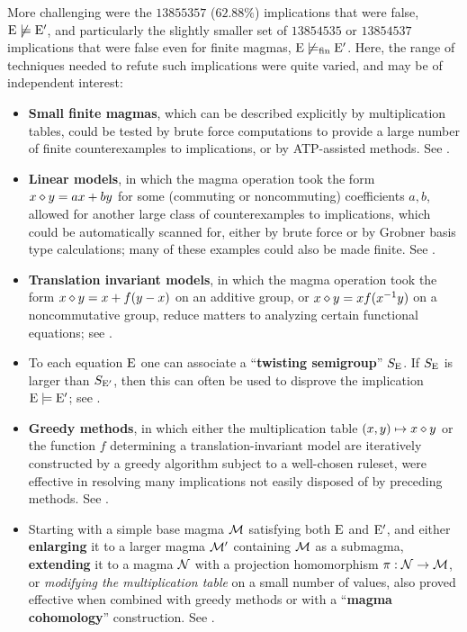 More challenging were the $\num{13855357}$ ($62.88\%$) implications that were false, $\mathrm{E} \not\models {\mathrm{E}'}$, and particularly the slightly smaller set of $\num{13854535}$ or $\num{13854537}$ implications that were false even for finite magmas, $\mathrm{E} \not\models_{\mathrm{fin}} {\mathrm{E}'}$. Here, the range of techniques needed to refute such implications were quite varied, and may be of independent interest:
\begin{itemize}
        \item \textbf{Small finite magmas}, which can be described explicitly by multiplication tables, could be tested by brute force computations to provide a large number of finite counterexamples to implications, or by ATP-assisted methods. See .
        \item \textbf{Linear models}, in which the magma operation took the form $x \diamond y = ax + by$ for some (commuting or noncommuting) coefficients $a,b$, allowed for another large class of counterexamples to implications, which could be automatically scanned for, either by brute force or by Grobner basis type calculations; many of these examples could also be made finite. See .
        \item \textbf{Translation invariant models}, in which the magma operation took the form $x \diamond y = x + f(y-x)$ on an additive group, or $x \diamond y = x f(x^{-1} y)$ on a noncommutative group, reduce matters to analyzing certain functional equations; see .
        \item To each equation $\mathrm{E}$ one can associate a ``\textbf{twisting semigroup}'' $S_{\mathrm{E}}$.  If $S_{\mathrm{E}}$ is larger than $S_{{\mathrm{E}'}}$, then this can often be used to disprove the implication ${\mathrm{E}} \models {\mathrm{E}'}$; see .
        \item \textbf{Greedy methods}, in which either the multiplication table $(x,y) \mapsto x \diamond y$ or the function $f$ determining a translation-invariant model are iteratively constructed by a greedy algorithm subject to a well-chosen ruleset, were effective in resolving many implications not easily disposed of by preceding methods. See .
        \item Starting with a simple base magma ${\mathcal{M}}$ satisfying both $\mathrm{E}$ and ${\mathrm{E}'}$, and either \textbf{enlarging} it to a larger magma ${\mathcal{M}}'$ containing ${\mathcal{M}}$ as a submagma, \textbf{extending} it to a magma ${\mathcal{N}}$ with a projection homomorphism $\pi: {\mathcal{N}} \to {\mathcal{M}}$, or \emph{modifying the multiplication table} on a small number of values, also proved effective when combined with greedy methods or with a ``\textbf{magma cohomology}'' construction. See .

\end{itemize}
